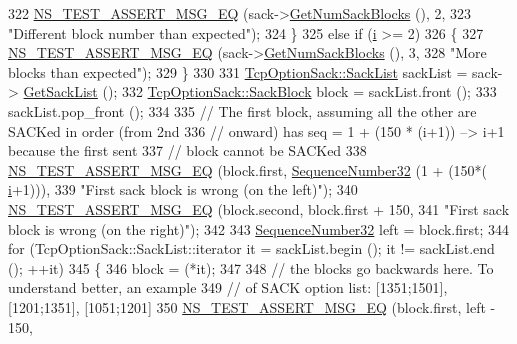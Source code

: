 \begin{DoxyCode}
322           \hyperlink{group__testing_ga2a9d78cffb3db8e867c35fff0b698cf5}{NS\_TEST\_ASSERT\_MSG\_EQ} (sack->\hyperlink{classns3_1_1TcpOptionSack_a4700d3fed6cd67def0c18ce47298e767}{GetNumSackBlocks} (), 2,
323                                  \textcolor{stringliteral}{"Different block number than expected"});
324         \}
325       \textcolor{keywordflow}{else} \textcolor{keywordflow}{if} (\hyperlink{bernuolliDistribution_8m_a6f6ccfcf58b31cb6412107d9d5281426}{i} >= 2)
326         \{
327           \hyperlink{group__testing_ga2a9d78cffb3db8e867c35fff0b698cf5}{NS\_TEST\_ASSERT\_MSG\_EQ} (sack->\hyperlink{classns3_1_1TcpOptionSack_a4700d3fed6cd67def0c18ce47298e767}{GetNumSackBlocks} (), 3,
328                                  \textcolor{stringliteral}{"More blocks than expected"});
329         \}
330 
331       \hyperlink{classns3_1_1TcpOptionSack_a2aa2d721c71424680d79ebaa079f264a}{TcpOptionSack::SackList} sackList = sack->
      \hyperlink{classns3_1_1TcpOptionSack_a08840a554682aeb3aadbccfbb1f6b6fa}{GetSackList} ();
332       \hyperlink{classns3_1_1TcpOptionSack_a9e1d07d8729fd3ac5ead7305794675c3}{TcpOptionSack::SackBlock} block = sackList.front ();
333       sackList.pop\_front ();
334 
335       \textcolor{comment}{// The first block, assuming all the other are SACKed in order (from 2nd}
336       \textcolor{comment}{// onward) has seq = 1 + (150 * (i+1)) --> i+1 because the first sent}
337       \textcolor{comment}{// block cannot be SACKed}
338       \hyperlink{group__testing_ga2a9d78cffb3db8e867c35fff0b698cf5}{NS\_TEST\_ASSERT\_MSG\_EQ} (block.first, \hyperlink{classns3_1_1SequenceNumber}{SequenceNumber32} (1 + (150*(
      \hyperlink{bernuolliDistribution_8m_a6f6ccfcf58b31cb6412107d9d5281426}{i}+1))),
339                              \textcolor{stringliteral}{"First sack block is wrong (on the left)"});
340       \hyperlink{group__testing_ga2a9d78cffb3db8e867c35fff0b698cf5}{NS\_TEST\_ASSERT\_MSG\_EQ} (block.second, block.first + 150,
341                              \textcolor{stringliteral}{"First sack block is wrong (on the right)"});
342 
343       \hyperlink{classns3_1_1SequenceNumber}{SequenceNumber32} left = block.first;
344       \textcolor{keywordflow}{for} (TcpOptionSack::SackList::iterator it = sackList.begin (); it != sackList.end (); ++it)
345         \{
346           block = (*it);
347 
348           \textcolor{comment}{// the blocks go backwards here. To understand better, an example}
349           \textcolor{comment}{// of SACK option list: [1351;1501], [1201;1351], [1051;1201]}
350           \hyperlink{group__testing_ga2a9d78cffb3db8e867c35fff0b698cf5}{NS\_TEST\_ASSERT\_MSG\_EQ} (block.first, left - 150,

\end{DoxyCode}
